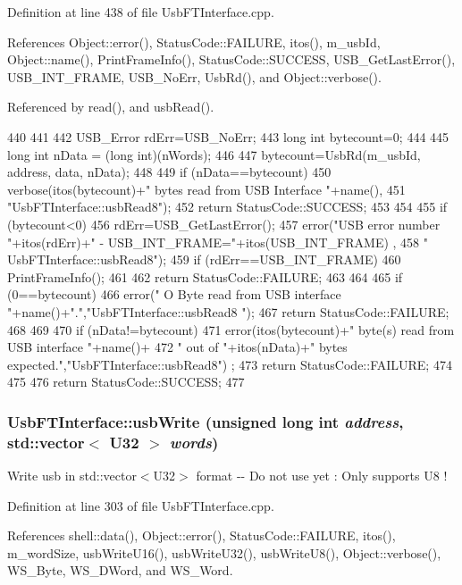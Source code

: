 Definition at line 438 of file UsbFTInterface.cpp.

References Object::error(), StatusCode::FAILURE, itos(), m\_\-usbId, Object::name(), PrintFrameInfo(), StatusCode::SUCCESS, USB\_\-GetLastError(), USB\_\-INT\_\-FRAME, USB\_\-NoErr, UsbRd(), and Object::verbose().

Referenced by read(), and usbRead().


\begin{DoxyCode}
440                                                              {
441   
442   USB_Error rdErr=USB_NoErr;
443   long int bytecount=0;
444 
445   long int nData = (long int)(nWords);
446 
447   bytecount=UsbRd(m_usbId, address, data, nData);
448 
449   if (nData==bytecount){
450     verbose(itos(bytecount)+" bytes read from USB Interface "+name(),
451             "UsbFTInterface::usbRead8");
452     return StatusCode::SUCCESS;
453   }
454 
455   if (bytecount<0){
456     rdErr=USB_GetLastError();
457     error("USB error number "+itos(rdErr)+" - USB_INT_FRAME="+itos(USB_INT_FRAME)
      ,
458             " UsbFTInterface::usbRead8");
459     if (rdErr==USB_INT_FRAME){
460       PrintFrameInfo();
461     } 
462     return StatusCode::FAILURE;
463   }
464   
465   if (0==bytecount){
466     error(" O Byte read from USB interface "+name()+".","UsbFTInterface::usbRead8
      ");
467     return StatusCode::FAILURE;
468   }
469 
470   if (nData!=bytecount){
471     error(itos(bytecount)+" byte(s) read from USB interface "+name()+
472             " out of "+itos(nData)+" bytes expected.","UsbFTInterface::usbRead8")
      ;
473     return StatusCode::FAILURE;    
474   }
475 
476   return StatusCode::SUCCESS;
477 }
\end{DoxyCode}
\hypertarget{classUsbFTInterface_ab7bf021f1fa3af385234e639c84827ef}{
\subsubsection[{usbWrite}]{ UsbFTInterface::usbWrite (unsigned long int {\em address}, \/  std::vector$<$ {\bf U32} $>$ {\em words})}}
\label{classUsbFTInterface_ab7bf021f1fa3af385234e639c84827ef}
Write usb in std::vector$<$U32$>$ format -\/-\/ Do not use yet : Only supports U8 ! 

Definition at line 303 of file UsbFTInterface.cpp.

References shell::data(), Object::error(), StatusCode::FAILURE, itos(), m\_\-wordSize, usbWriteU16(), usbWriteU32(), usbWriteU8(), Object::verbose(), WS\_\-Byte, WS\_\-DWord, and WS\_\-Word.

